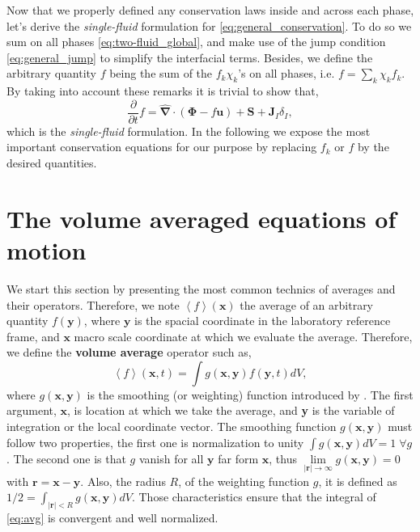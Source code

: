 \documentclass[twocolumn]{My_article}
\newcommand{\nablabh}{\hat{\bm{\nabla}}}
\newcommand{\pddt}{\frac{\partial}{\partial t}}
\begin{document}
Now that we properly defined any conservation laws inside and across each phase, let's derive the \textit{single-fluid} formulation for \ref{eq:general_conservation}.
To do so we sum on all phases \ref{eq:two-fluid_global}, and make use of the jump condition \ref{eq:general_jump} to simplify the interfacial terms.
Besides, we define the arbitrary quantity $f$ being the sum of the $f_k\chi_k$'s on all phases, i.e. $f = \sum_k \chi_k f_k$.
By taking into account these remarks it is trivial to show that,
\begin{equation}
    \pddt f
    = \nablabh \cdot (\bm{\Phi} - f \textbf{u})
    + \textbf{S}
    + \textbf{J}_I \delta_I,
    \label{eq:single-fluid_global}
\end{equation}
which is the \textit{single-fluid} formulation.
In the following we expose the most important conservation equations for our purpose by replacing $f_k$ or $f$ by the desired quantities.


\section{The volume averaged equations of motion}

We start this section by presenting the most common technics of averages and their operators.
Therefore, we note $\left<f\right>(\textbf{x})$ the average of an arbitrary quantity $f(\textbf{y})$,
where $\textbf{y}$ is the spacial coordinate in the laboratory reference frame,
and $\textbf{x}$ macro scale coordinate at which we evaluate the average.
Therefore, we define the \textbf{volume average} operator such as,
\begin{equation}
    \left<f\right>(\textbf{x},t) = \int g(\textbf{x},\textbf{y}) f(\textbf{y},t)dV,
    \label{eq:avg}
\end{equation}
where $g(\textbf{x},\textbf{y})$ is the smoothing (or weighting) function introduced by
\citet{jackson1997locally,marle1982macroscopic}.
The first argument, $\textbf{x}$, is location at which we take the average, and \textbf{y} is the variable of integration or the local coordinate vector.
The smoothing function $g(\textbf{x},\textbf{y})$ must follow two properties, the first one is normalization to unity
$\int g(\textbf{x},\textbf{y}) dV = 1 \;\forall g$.
The second one is that $g$ vanish for all $\textbf{y}$ far form $\textbf{x}$, thus $\lim\limits_{|\textbf{r}| \to \infty} g(\textbf{x},\textbf{y}) = 0$ with $\textbf{r} = \textbf{x} - \textbf{y}$.
Also, the radius $R$, of the weighting function $g$, it is defined as $1/2 = \int_{|\textbf{r}|<R} g(\textbf{x},\textbf{y})dV$.
Those characteristics ensure that the integral of \ref{eq:avg} is convergent and well normalized.
\end{document}
